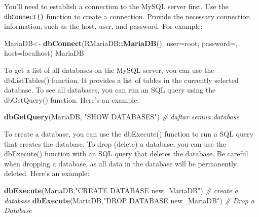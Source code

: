 \documentclass[
]{book}
\newenvironment{Shaded}{\begin{snugshade}}{\end{snugshade}}
\newcommand{\AttributeTok}[1]{\textcolor[rgb]{0.13,0.29,0.53}{#1}}
\newcommand{\CommentTok}[1]{\textcolor[rgb]{0.56,0.35,0.01}{\textit{#1}}}
\newcommand{\FunctionTok}[1]{\textcolor[rgb]{0.13,0.29,0.53}{\textbf{#1}}}
\newcommand{\NormalTok}[1]{#1}
\newcommand{\OtherTok}[1]{\textcolor[rgb]{0.56,0.35,0.01}{#1}}
\newcommand{\SpecialCharTok}[1]{\textcolor[rgb]{0.81,0.36,0.00}{\textbf{#1}}}
\newcommand{\StringTok}[1]{\textcolor[rgb]{0.31,0.60,0.02}{#1}}
\begin{document}
You'll need to establish a connection to the MySQL server first. Use the \texttt{dbConnect()} function to create a connection. Provide the necessary connection information, such as the host, user, and password. For example:

\begin{Shaded}
\begin{Highlighting}[]
\NormalTok{MariaDB}\OtherTok{\textless{}{-}} \FunctionTok{dbConnect}\NormalTok{(RMariaDB}\SpecialCharTok{::}\FunctionTok{MariaDB}\NormalTok{(), }
                  \AttributeTok{user=}\StringTok{\textquotesingle{}root\textquotesingle{}}\NormalTok{,}
                  \AttributeTok{password=}\StringTok{\textquotesingle{}\textquotesingle{}}\NormalTok{, }
                  \AttributeTok{host=}\StringTok{\textquotesingle{}localhost\textquotesingle{}}\NormalTok{)}
\NormalTok{MariaDB}
\end{Highlighting}
\end{Shaded}

To get a list of all databases on the MySQL server, you can use the dbListTables() function. It provides a list of tables in the currently selected database. To see all databases, you can run an SQL query using the dbGetQuery() function. Here's an example:

\begin{Shaded}
\begin{Highlighting}[]
\FunctionTok{dbGetQuery}\NormalTok{(MariaDB, }\StringTok{"SHOW DATABASES"}\NormalTok{)          }\CommentTok{\# daftar semua database}
\end{Highlighting}
\end{Shaded}

To create a database, you can use the dbExecute() function to run a SQL query that creates the database. To drop (delete) a database, you can use the dbExecute() function with an SQL query that deletes the database. Be careful when dropping a database, as all data in the database will be permanently deleted. Here's an example:

\begin{Shaded}
\begin{Highlighting}[]
\FunctionTok{dbExecute}\NormalTok{(MariaDB,}\StringTok{"CREATE DATABASE new\_MariaDB"}\NormalTok{) }\CommentTok{\# create a database}
\FunctionTok{dbExecute}\NormalTok{(MariaDB,}\StringTok{"DROP DATABASE new\_MariaDB"}\NormalTok{)    }\CommentTok{\# Drop a Database}
\end{Highlighting}
\end{Shaded}
\end{document}
